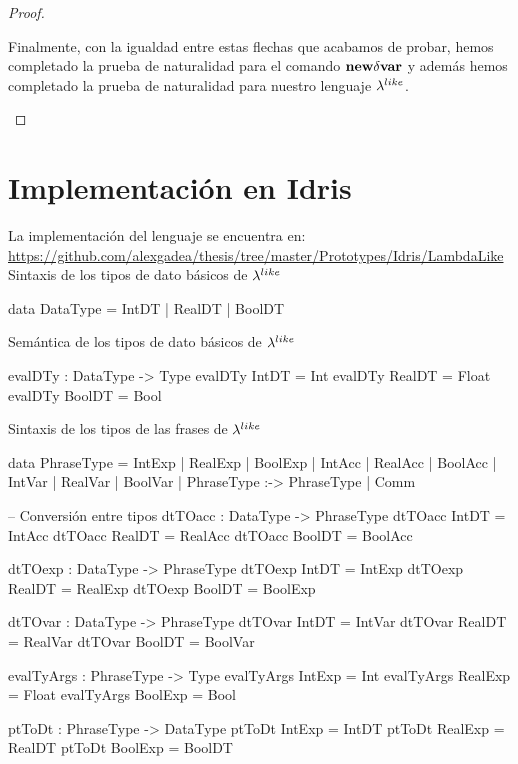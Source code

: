\begin{proof}
\begin{itemize}
\begin{itemize}
\begin{itemize}
Finalmente, con la igualdad entre estas flechas que acabamos de probar, hemos completado
la prueba de naturalidad para el comando $\textbf{new} \delta \textbf{var}$ y adem\'as hemos completado
la prueba de naturalidad para nuestro lenguaje $\lambda^{like}$.
\end{itemize}
\end{itemize}
\end{itemize}
\end{proof}

\section{Implementaci\'on en Idris}

La implementaci\'on del lenguaje se encuentra en:\\
\url{https://github.com/alexgadea/thesis/tree/master/Prototypes/Idris/LambdaLike}\\

\noindent
Sintaxis de los tipos de dato b\'asicos de $\lambda^{like}$

\begin{code}
data DataType = IntDT | RealDT | BoolDT
\end{code}

\noindent Sem\'antica de los tipos de dato b\'asicos de $\lambda^{like}$

\begin{code}
evalDTy : DataType -> Type
evalDTy IntDT  = Int
evalDTy RealDT = Float
evalDTy BoolDT = Bool
\end{code}

\noindent Sintaxis de los tipos de las frases de $\lambda^{like}$
\begin{code}
data PhraseType = IntExp | RealExp | BoolExp 
                | IntAcc | RealAcc | BoolAcc
                | IntVar | RealVar | BoolVar
                | PhraseType :-> PhraseType
                | Comm

-- Conversión entre tipos
dtTOacc : DataType -> PhraseType
dtTOacc IntDT  = IntAcc
dtTOacc RealDT = RealAcc
dtTOacc BoolDT = BoolAcc
\end{code}

\newpage

\begin{code}
dtTOexp : DataType -> PhraseType
dtTOexp IntDT  = IntExp
dtTOexp RealDT = RealExp
dtTOexp BoolDT = BoolExp

dtTOvar : DataType -> PhraseType
dtTOvar IntDT  = IntVar
dtTOvar RealDT = RealVar
dtTOvar BoolDT = BoolVar

evalTyArgs : PhraseType -> Type
evalTyArgs IntExp  = Int
evalTyArgs RealExp = Float
evalTyArgs BoolExp = Bool

ptToDt : PhraseType -> DataType
ptToDt IntExp  = IntDT
ptToDt RealExp = RealDT
ptToDt BoolExp = BoolDT

\end{code}

